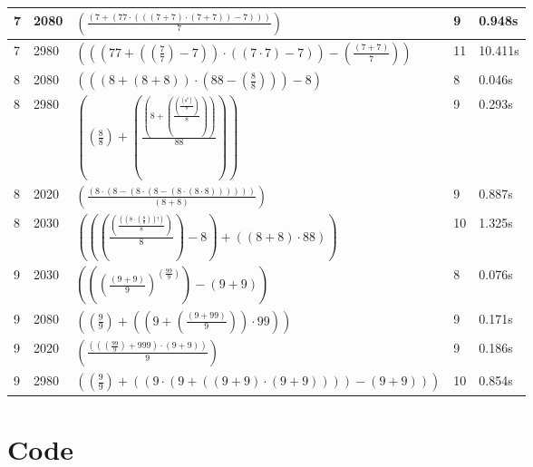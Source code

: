 \documentclass{article}
\theoremstyle{nonumberplain}
\begin{document}
\begin{center}
\begin{longtable}{ | l | l | p{9.5cm} | l | l | }
            7 & 2080 & \( \left(\frac{\left(7 + \left(77 \cdot \left(\left(\left(7 + 7\right) \cdot \left(7 + 7\right)\right) - 7\right)\right)\right)}{7}\right) \) & 9 & 0.948s \\\hline
            7 & 2980 & \( \left(\left(\left(77 + \left(\left(\frac{7}{7}\right) - 7\right)\right) \cdot \left(\left(7 \cdot 7\right) - 7\right)\right) - \left(\frac{\left(7 + 7\right)}{7}\right)\right) \) & 11 & 10.411s \\\hline
            8 & 2080 & \( \left(\left(\left(8 + \left(8 + 8\right)\right) \cdot \left(88 - \left(\frac{8}{8}\right)\right)\right) - 8\right) \) & 8 & 0.046s \\\hline
            8 & 2980 & \( \left(\left(\frac{8}{8}\right) + \left(\frac{\left(8 + \left(\frac{\left(\frac{\left({8}^{8}\right)}{8}\right)}{8}\right)\right)}{88}\right)\right) \) & 9 & 0.293s \\\hline
            8 & 2020 & \( \left(\frac{\left(8 \cdot \left(8 - \left(8 \cdot \left(8 - \left(8 \cdot \left(8 \cdot 8\right)\right)\right)\right)\right)\right)}{\left(8 + 8\right)}\right) \) & 9 & 0.887s \\\hline
            8 & 2030 & \( \left(\left(\left(\frac{\left(\frac{\left(\left(8 \cdot \left(\frac{8}{8}\right)\right)!\right)}{8}\right)}{8}\right) - 8\right) + \left(\left(8 + 8\right) \cdot 88\right)\right) \) & 10 & 1.325s \\\hline
            9 & 2030 & \( \left(\left({\left(\frac{\left(9 + 9\right)}{9}\right)}^{\left(\frac{99}{9}\right)}\right) - \left(9 + 9\right)\right) \) & 8 & 0.076s \\\hline
            9 & 2080 & \( \left(\left(\frac{9}{9}\right) + \left(\left(9 + \left(\frac{\left(9 + 99\right)}{9}\right)\right) \cdot 99\right)\right) \) & 9 & 0.171s \\\hline
            9 & 2020 & \( \left(\frac{\left(\left(\left(\frac{99}{9}\right) + 999\right) \cdot \left(9 + 9\right)\right)}{9}\right) \) & 9 & 0.186s \\\hline
            9 & 2980 & \( \left(\left(\frac{9}{9}\right) + \left(\left(9 \cdot \left(9 + \left(\left(9 + 9\right) \cdot \left(9 + 9\right)\right)\right)\right) - \left(9 + 9\right)\right)\right) \) & 10 & 0.854s \\\hline
    \end{longtable}
\end{center}

\section{Code}
\end{document}
